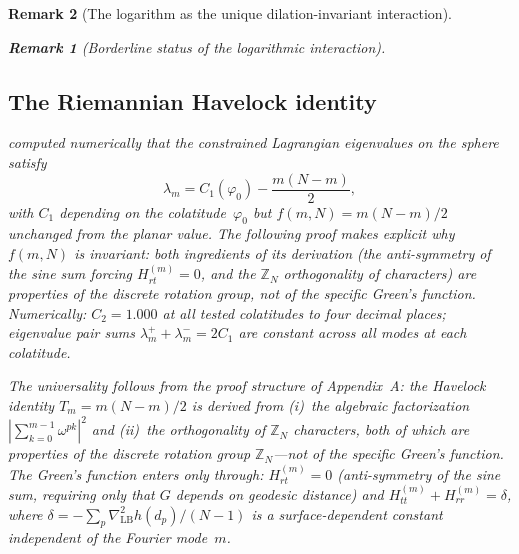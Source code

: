 \documentclass[12pt, a4paper]{article}
\newtheorem{remark}{Remark}[section]
\numberwithin{equation}{section}
\begin{document}
\begin{remark}[The logarithm as the unique dilation-invariant interaction]
\begin{remark}[Borderline status of the logarithmic interaction]
\subsection{The Riemannian Havelock identity}
\label{sec:riemannian}

\citet{BoattoCabral2003} computed numerically that the constrained
Lagrangian eigenvalues on the sphere satisfy
\begin{equation}\label{eq:riemannian-havelock}
  \lambda_m = C_1(\varphi_0) - \frac{m(N-m)}{2},
\end{equation}
with $C_1$ depending on the colatitude~$\varphi_0$ but $f(m,N) = m(N{-}m)/2$
unchanged from the planar value.  The following proof makes explicit
\emph{why} $f(m,N)$ is invariant: both ingredients of its derivation
(the anti-symmetry of the sine sum forcing $H_{rt}^{(m)} = 0$, and the
$\mathbb{Z}_N$ orthogonality of characters) are properties of the
discrete rotation group, not of the specific Green's function.
Numerically: $C_2 = 1.000$ at all tested colatitudes to four decimal
places; eigenvalue pair sums $\lambda_m^+ + \lambda_m^- = 2C_1$ are
constant across all modes at each colatitude.

The universality follows from the proof structure of Appendix~A:
the Havelock identity $T_m = m(N{-}m)/2$ is derived from (i)~the
algebraic factorization $|{\sum_{k=0}^{m-1}\omega^{pk}}|^2$ and
(ii)~the orthogonality of $\mathbb{Z}_N$ characters, both of which
are properties of the discrete rotation group $\mathbb{Z}_N$---not
of the specific Green's function.  The Green's function enters
only through: $H_{rt}^{(m)} = 0$ (anti-symmetry of the sine sum,
requiring only that $G$ depends on geodesic distance) and
$H_{tt}^{(m)} + H_{rr}^{(m)} = \delta$, where
$\delta = -\sum_p \nabla^2_{\mathrm{LB}} h(d_p)/(N{-}1)$ is a
surface-dependent constant \emph{independent of the Fourier mode~$m$}.


\end{remark}
\end{remark}
\end{document}
